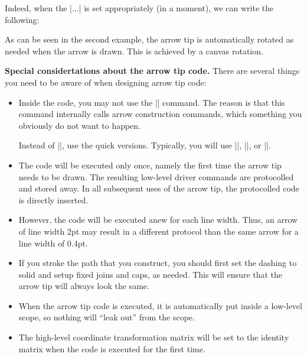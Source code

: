 \begin{command}{\pgfarrowsdeclare{}}
  Indeed, when the |...| is set appropriately (in a moment), we can
  write the following:
{
  \pgfsetdash{}{0pt} %
  \pgfsetroundjoin   %
  \pgfsetroundcap    %
  \pgfpathmoveto{\pgfpoint{-10pt}{10pt}}
  \pgfusepathqstroke
}
\begin{codeexample}[]
\end{codeexample}

  As can be seen in the second example, the arrow tip is automatically
  rotated as needed when the arrow is drawn. This is achieved by a
  canvas rotation.

  \medskip
  \textbf{Special considertations about the arrow tip code.}
  There are several things you need to be aware of when designing
  arrow tip code:
  \begin{itemize}
  \item
    Inside the code, you may not use the |\pgfusepath|
    command. The reason is that this command internally calls arrow
    construction commands, which something you obviously do not want
    to happen.

    Instead of |\pgfusepath|, use the quick versions. Typically, you
    will use |\pgfusepathqstroke|, |\pgfusepathqfill|, or
    |\pgfusepathqfillstroke|.
  \item
    The code will be executed only once, namely the first time the
    arrow tip needs to be drawn. The resulting low-level driver
    commands are protocolled and stored away. In all subsequent 
    uses of the arrow tip, the protocolled code is directly inserted.
  \item
    However, the code will be executed anew for each line width. Thus,
    an arrow of line width 2pt may result in a different protocol than
    the same arrow for a line width of 0.4pt.
  \item
    If you stroke the path that you construct, you should first set
    the dashing to solid and setup fixed joins and caps, as
    needed. This will ensure that the arrow tip will always look the
    same.
  \item
    When the arrow tip code is executed, it is automatically put
    inside a low-level scope, so nothing will ``leak out'' from the
    scope.
  \item
    The high-level coordinate transformation matrix will be set to the
    identity matrix when the code is executed for the first time.
  \end{itemize}


\end{command}

